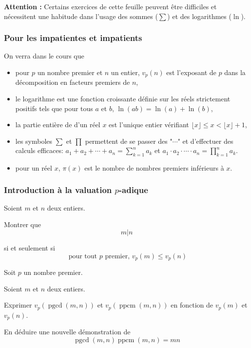 

\textbf{Attention :} Certains exercices de cette feuille peuvent être difficiles et nécessitent une habitude dans l'usage des sommes ($\sum$) et des logarithmes ($\ln$).


\subsubsection{Pour les impatientes et impatients}


On verra dans le cours que

\begin{itemize}
\item pour $p$ un nombre premier et $n$ un entier, $v_p(n)$ est l'exposant de $p$ dans la décomposition en facteurs premiers de $n$,
\item le logarithme est une fonction croissante définie sur les réels strictement positifs tels que pour tous $a$ et $b$, $\ln(ab) = \ln(a) + \ln(b)$,
\item la partie entière de d'un réel $x$ est l'unique entier vérifiant $\lfloor x \rfloor \le x < \lfloor x \rfloor +1$,
\item les symboles $\sum$ et $\prod$ permettent de se passer des "$\cdots$" et d'effectuer des calculs efficaces: $a_1 + a_2 + \cdots + a_n = \sum_{k=1}^n a_k$ et $a_1 \cdot a_2 \cdot \cdots \cdot a_n = \prod_{k=1}^n a_k$.
\item pour un réel $x$, $\pi(x)$ est le nombre de nombres premiers inférieurs à $x$.
\end{itemize}


\subsubsection{Introduction à la valuation $p$-adique}

\begin{exo}
Soient $m$ et $n$ deux entiers.

Montrer que
$$m | n$$

si et seulement si
$$\text{ pour tout } p \text{ premier, } v_p(m) \le v_p(n)$$
\end{exo}

\begin{exo}
Soit $p$ un nombre premier.

Soient $m$ et $n$ deux entiers.

Exprimer $v_p(\operatorname{pgcd}(m,n))$ et $v_p(\operatorname{ppcm}(m,n))$ en fonction de $v_p(m)$ et $v_p(n)$.

En déduire une nouvelle démonstration de
$$\operatorname{pgcd}(m,n) \operatorname{ppcm}(m,n) = m n$$
\end{exo}



